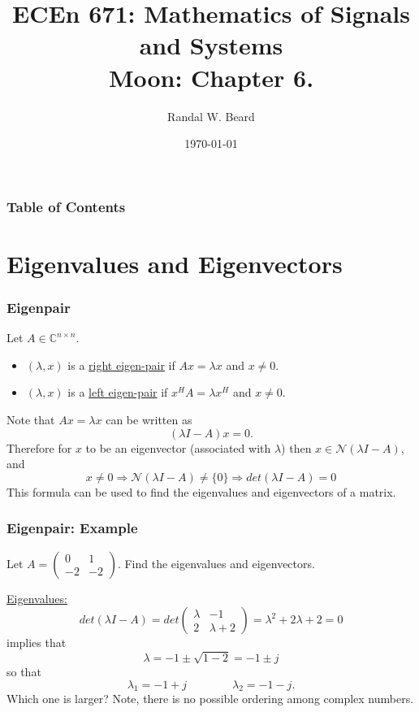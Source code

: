 \documentclass{beamer}
\title{ECEn 671: Mathematics of Signals and Systems \\ 
Moon: Chapter 6.}
\author{Randal W. Beard}
\institute{Brigham Young University}
\date{\today}
\begin{document}
\begin{frame}
	\titlepage
\end{frame}

\begin{frame}[t]
\frametitle{Table of Contents}
\tableofcontents
\end{frame}

\section{Eigenvalues and Eigenvectors}
\frame{\sectionpage}


\begin{frame}\frametitle{Eigenpair}
	Let $A\in\mathbb{C}^{n\times n}$.
	\begin{definition}
		\begin{itemize}
		  \item $(\lambda,x)$ is a \underline{right eigen-pair} if $Ax=\lambda x$ and $x \neq 0$.
		  \item $(\lambda,x)$ is a \underline{left eigen-pair} if $x^HA=\lambda x^H$ and $x\neq 0$.
		\end{itemize}		
	\end{definition}
	Note that $Ax = \lambda x$ can be written as
	\[ 
		(\lambda I - A)x = 0. 
	\]
	Therefore for $x$ to be an eigenvector (associated with $\lambda $) then $x\in\mathcal{N}(\lambda I-A)$, and
	\[
		x\neq 0 \Rightarrow \mathcal{N}(\lambda I-A) \neq \{0\} \Rightarrow det(\lambda I-A)=0 
	\]
	This formula can be used to find the eigenvalues and eigenvectors of a matrix.
\end{frame}

\begin{frame}\frametitle{Eigenpair: Example}
	Let $A = \begin{pmatrix}
	    0 & 1\\
	    -2 & -2
	  \end{pmatrix}$.  
	Find the eigenvalues and eigenvectors.
	
	\par\underline{Eigenvalues:}
		\[ 
		det(\lambda I - A) 
			= det\begin{pmatrix}
    				\lambda  & -1\\
   					 2 & \lambda +2
  				  \end{pmatrix} 
  			= \lambda^2 + 2\lambda  + 2 
  			= 0
  	\]
  	implies that
	\[ 
		\lambda  = -1 \pm \sqrt{1-2} 
		         = -1 \pm j 
	\]
	so that
	\[ 
		\lambda_1 = -1 + j 
		\qquad \qquad 
		\lambda_2 = -1 - j.
	\]
Which one is larger?  Note, there is no possible ordering among complex numbers.
	
\end{frame}
\end{document}
